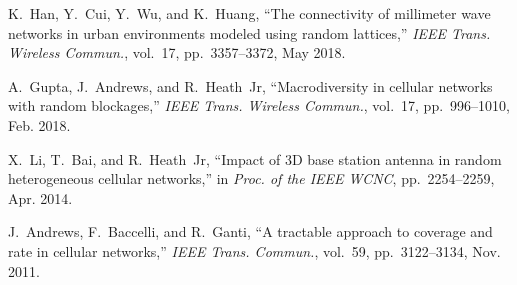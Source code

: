 \documentclass[12pt, draftclsnofoot, onecolumn]{IEEEtran}
\begin{document}
\begin{thebibliography}{10}
K.~Han, Y.~Cui, Y.~Wu, and K.~Huang, ``The connectivity of millimeter wave
  networks in urban environments modeled using random lattices,'' {\em IEEE
  Trans. Wireless Commun.}, vol.~17, pp.~3357--3372, May 2018.

A.~Gupta, J.~Andrews, and R.~Heath~Jr, ``Macrodiversity in cellular networks
  with random blockages,'' {\em IEEE Trans. Wireless Commun.}, vol.~17,
  pp.~996--1010, Feb. 2018.

X.~Li, T.~Bai, and R.~Heath~Jr, ``Impact of 3{D} base station antenna in random
  heterogeneous cellular networks,'' in {\em Proc. of the IEEE WCNC},
  pp.~2254--2259, Apr. 2014.

J.~Andrews, F.~Baccelli, and R.~Ganti, ``A tractable approach to coverage and
  rate in cellular networks,'' {\em IEEE Trans. Commun.}, vol.~59,
  pp.~3122--3134, Nov. 2011.

\end{thebibliography}
\end{document}

